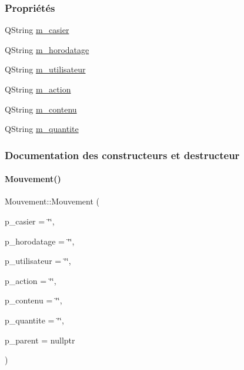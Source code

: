 \subsubsection*{Propriétés}
\begin{DoxyCompactItemize}
\item 
Q\+String \hyperlink{class_mouvement_a186f483cf82ff2866da1e10031838567}{m\+\_\+casier}
\item 
Q\+String \hyperlink{class_mouvement_a24f34a74c17068f6c98635400862adcd}{m\+\_\+horodatage}
\item 
Q\+String \hyperlink{class_mouvement_adee253bf00365d1cb4c45bd58d8b3e58}{m\+\_\+utilisateur}
\item 
Q\+String \hyperlink{class_mouvement_af0444a7f837bdf252f2a3ccd4eb8a701}{m\+\_\+action}
\item 
Q\+String \hyperlink{class_mouvement_a631b133243576c36fec6e1912415d7d6}{m\+\_\+contenu}
\item 
Q\+String \hyperlink{class_mouvement_ab6040d52ca99ef88d253b1742e70ffd3}{m\+\_\+quantite}
\end{DoxyCompactItemize}


\subsubsection{Documentation des constructeurs et destructeur}
\mbox{\label{class_mouvement_a18a2064ccc33ffefd5b56c7ba2630c8b}} 
\paragraph{\texorpdfstring{Mouvement()}{Mouvement()}}
{\footnotesize\ttfamily Mouvement\+::\+Mouvement (\begin{DoxyParamCaption}\item[{Q\+String}]{p\+\_\+casier = {\ttfamily \char`\"{}\char`\"{}},  }\item[{Q\+String}]{p\+\_\+horodatage = {\ttfamily \char`\"{}\char`\"{}},  }\item[{Q\+String}]{p\+\_\+utilisateur = {\ttfamily \char`\"{}\char`\"{}},  }\item[{Q\+String}]{p\+\_\+action = {\ttfamily \char`\"{}\char`\"{}},  }\item[{Q\+String}]{p\+\_\+contenu = {\ttfamily \char`\"{}\char`\"{}},  }\item[{Q\+String}]{p\+\_\+quantite = {\ttfamily \char`\"{}\char`\"{}},  }\item[{Q\+Object $\ast$}]{p\+\_\+parent = {\ttfamily nullptr} }\end{DoxyParamCaption})\hspace{0.3cm}{\ttfamily [explicit]}}


